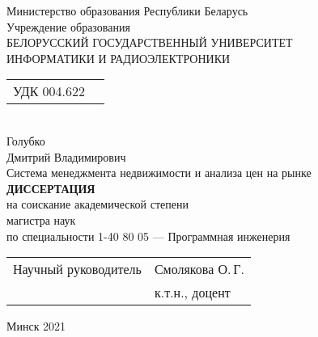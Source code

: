 \begin{titlepage}
  \begin{center}
    Министерство образования Республики Беларусь\\[1em]
    Учреждение образования\\
    БЕЛОРУССКИЙ ГОСУДАРСТВЕННЫЙ УНИВЕРСИТЕТ \\
    ИНФОРМАТИКИ И РАДИОЭЛЕКТРОНИКИ\\[3em]

    \begin{tabular}{ p{}p{} }
      УДК 004.622 & \\
    \end{tabular}\\[5em]


    {Голубко}\\
    {Дмитрий Владимирович}\\[1em]

    {Система менеджмента недвижимости и анализа цен на рынке}\\[5em]

    \textbf{ДИССЕРТАЦИЯ}\\
    {на соискание академической степени}\\
    {магистра наук}\\[1em]

    {по специальности 1-40 80 05 — Программная инженерия}\\[8em]

    \begin{tabular}{ p{}p{} }
      Научный руководитель & Смолякова О.\,Г. \\
       & к.т.н., доцент\\
    \end{tabular}
    
    \vfill
    {\normalsize Минск 2021}
  \end{center}
\end{titlepage}
